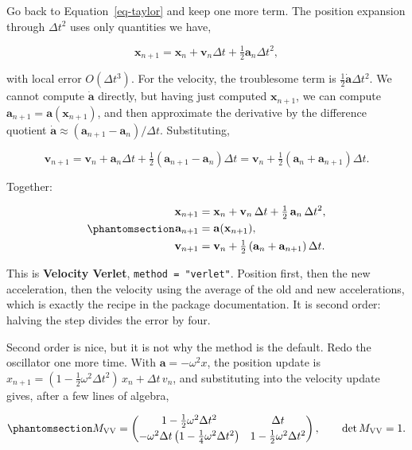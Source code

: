 \documentclass[
  10.5pt,
  letterpaper,
]{scrbook}
\theoremstyle{plain}
\theoremstyle{remark}
\begin{document}
Go back to Equation~\ref{eq-taylor} and keep one more term. The position
expansion through \(\Delta t^2\) uses only quantities we have,

\[
\mathbf{x}_{n+1} = \mathbf{x}_n + \mathbf{v}_n\Delta t + \tfrac12\mathbf{a}_n\Delta t^2,
\]

with local error \(O(\Delta t^3)\). For the velocity, the troublesome
term is \(\tfrac12\dot{\mathbf{a}}\Delta t^2\). We cannot compute
\(\dot{\mathbf{a}}\) directly, but having just computed
\(\mathbf{x}_{n+1}\), we can compute
\(\mathbf{a}_{n+1} = \mathbf{a}(\mathbf{x}_{n+1})\), and then
approximate the derivative by the difference quotient
\(\dot{\mathbf{a}} \approx (\mathbf{a}_{n+1} - \mathbf{a}_n)/\Delta t\).
Substituting,

\[
\mathbf{v}_{n+1} = \mathbf{v}_n + \mathbf{a}_n\Delta t + \tfrac12(\mathbf{a}_{n+1} - \mathbf{a}_n)\Delta t
= \mathbf{v}_n + \tfrac12(\mathbf{a}_n + \mathbf{a}_{n+1})\Delta t.
\]

Together:

\begin{equation}\protect\phantomsection\label{eq-verlet}{
\begin{aligned}
\mathbf{x}_{n+1} &= \mathbf{x}_n + \mathbf{v}_n\,\Delta t + \tfrac12\,\mathbf{a}_n\,\Delta t^2, \\
\mathbf{a}_{n+1} &= \mathbf{a}(\mathbf{x}_{n+1}), \\
\mathbf{v}_{n+1} &= \mathbf{v}_n + \tfrac12\left(\mathbf{a}_n + \mathbf{a}_{n+1}\right)\Delta t.
\end{aligned}
}\end{equation}

This is \textbf{Velocity Verlet}, \texttt{method\ =\ "verlet"}. Position
first, then the new acceleration, then the velocity using the average of
the old and new accelerations, which is exactly the recipe in the
package documentation. It is second order: halving the step divides the
error by four.

Second order is nice, but it is not why the method is the default. Redo
the oscillator one more time. With \(\mathbf{a} = -\omega^2 x\), the
position update is
\(x_{n+1} = (1 - \tfrac12\omega^2\Delta t^2)\,x_n + \Delta t\, v_n\),
and substituting into the velocity update gives, after a few lines of
algebra,

\begin{equation}\protect\phantomsection\label{eq-vv-matrix}{
M_{\mathrm{VV}} = \begin{pmatrix}
1 - \tfrac12\omega^2\Delta t^2 & \Delta t \\[2pt]
-\omega^2\Delta t\left(1 - \tfrac14\omega^2\Delta t^2\right) & 1 - \tfrac12\omega^2\Delta t^2
\end{pmatrix},
\qquad \det M_{\mathrm{VV}} = 1.
}\end{equation}
\end{document}
